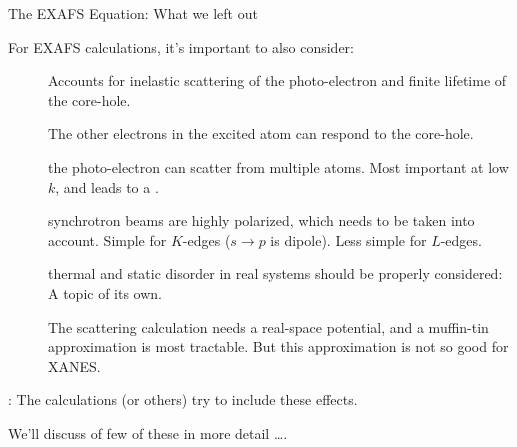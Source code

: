 \begin{slide}{The EXAFS Equation: What we left out}

    \vmm
\begin{cenpage}{110mm}

  For {} EXAFS calculations, it's important to
  also consider:

    \begin{description}
    \item[]  Accounts for inelastic
      scattering of the photo-electron and finite lifetime of the core-hole.

    \item[]   The other
      electrons in the excited atom can respond to the core-hole.

    \item[] the photo-electron can scatter
      from multiple atoms.  Most important at low $k$, and leads to a
      {}.

    \item[] synchrotron beams are highly
      polarized, which needs to be taken into account.  Simple for
      $K$-edges ($s\rightarrow p$ is dipole). Less simple for $L$-edges.

    \item[]  thermal and static disorder in real
      systems should be properly considered: A topic of its own.

    \item[] The scattering calculation needs
      a real-space potential, and a muffin-tin approximation is most
      tractable.  But this approximation is not so good for XANES.

    \end{description}

    {}:   The {\feff} calculations (or others) try to include these effects.


    \vmm \vmm
    We'll discuss of few of these in more detail \ldots.

\end{cenpage}


\vfill

\end{slide}
